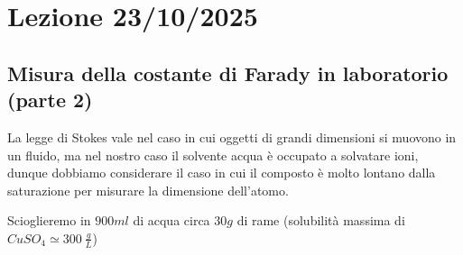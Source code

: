 \documentclass{article}
\begin{document}
\begin{center}
\end{center}

\section{Lezione 23/10/2025}
\subsection{Misura della costante di Farady in laboratorio (parte 2)}
La legge di Stokes vale nel caso in cui oggetti di grandi dimensioni si muovono in un fluido, 
ma nel nostro caso il solvente acqua è occupato a solvatare ioni, dunque dobbiamo considerare il caso 
in cui il composto è molto lontano dalla saturazione per misurare la dimensione dell'atomo.

Scioglieremo in $900 ml$ di acqua circa $30 g$ di rame (solubilità massima di $CuSO_4 \simeq 300 \: \frac{g}{L}$)
\end{document}
